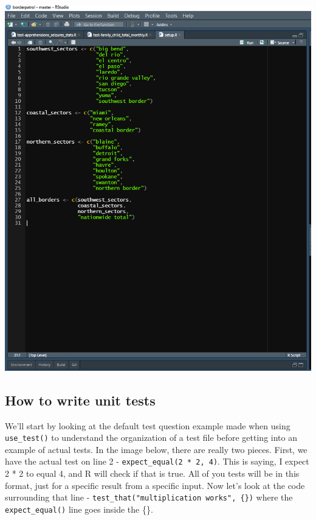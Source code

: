 \documentclass[
  12pt,
  openany]{book}
\begin{document}
\includegraphics{images/test_setup.PNG}

\hypertarget{how-to-write-unit-tests}{%
\subsection{How to write unit tests}\label{how-to-write-unit-tests}}

We'll start by looking at the default test question example made when using \texttt{use\_test()} to understand the organization of a test file before getting into an example of actual tests. In the image below, there are really two pieces. First, we have the actual test on line 2 - \texttt{expect\_equal(2\ *\ 2,\ 4)}. This is saying, I expect 2 * 2 to equal 4, and R will check if that is true. All of you tests will be in this format, just for a specific result from a specific input. Now let's look at the code surrounding that line - \texttt{test\_that("multiplication\ works",\ \{\})} where the \texttt{expect\_equal()} line goes inside the \{\}.
\end{document}
